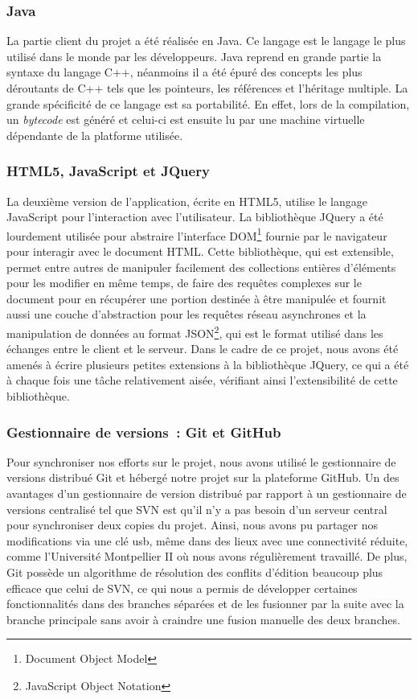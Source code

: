 \documentclass[a4paper,11pt,french]{article}
\begin{document}
\subsubsection{Java}
La partie client du projet a été réalisée en Java. Ce langage est le langage le plus utilisé dans le monde par les développeurs. Java reprend en grande partie la syntaxe du langage C++, néanmoins il a été épuré des concepts les plus déroutants de C++ tels que les pointeurs, les références et l'héritage multiple. La grande spécificité de ce langage est sa portabilité. En effet, lors de la compilation, un \emph{bytecode} est généré et celui-ci est ensuite lu par une machine virtuelle dépendante de la platforme utilisée.

\subsubsection{HTML5, JavaScript et JQuery}

La deuxième version de l'application, écrite en HTML5, utilise le langage JavaScript pour l'interaction avec l'utilisateur. La bibliothèque JQuery a été lourdement utilisée pour abstraire l'interface DOM\footnote{Document Object Model} fournie par le navigateur pour interagir avec le document HTML. Cette bibliothèque, qui est extensible, permet entre autres de manipuler facilement des collections entières d'éléments pour les modifier en même temps, de faire des requêtes complexes sur le document pour en récupérer une portion destinée à être manipulée et
fournit aussi une couche d'abstraction pour les requêtes réseau asynchrones et la manipulation de données au format JSON\footnote{JavaScript Object Notation}, qui est le format utilisé dans les échanges entre le client et le serveur. Dans le cadre de ce projet, nous avons été amenés à écrire plusieurs petites extensions à la bibliothèque JQuery, ce qui a été à chaque fois une tâche relativement aisée, vérifiant ainsi l'extensibilité de cette bibliothèque.

\subsubsection{Gestionnaire de versions~: Git et GitHub}

Pour synchroniser nos efforts sur le projet, nous avons utilisé le gestionnaire de versions distribué Git et hébergé notre projet sur la plateforme GitHub. Un des avantages d'un gestionnaire de version distribué par rapport à un gestionnaire de versions centralisé tel que SVN est qu'il n'y a pas besoin d'un serveur central pour synchroniser deux copies du projet. Ainsi, nous avons pu partager nos modifications via une clé usb, même dans des lieux avec une connectivité réduite, comme l'Université Montpellier II où nous avons régulièrement travaillé. 
De plus, Git possède un algorithme de résolution des conflits d'édition beaucoup plus efficace que celui de SVN, ce qui nous a permis de développer certaines fonctionnalités dans des branches séparées et de les fusionner par la suite avec la branche principale sans avoir à craindre une fusion manuelle des deux branches.
\end{document}

